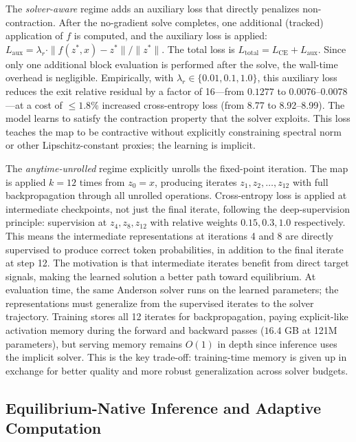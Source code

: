 The \emph{solver-aware} regime adds an auxiliary loss that directly penalizes non-contraction. After the no-gradient solve completes, one additional (tracked) application of $f$ is computed, and the auxiliary loss is applied: $L_\text{aux} = \lambda_r \cdot \|f(z^*, x) - z^*\| / \|z^*\|$. The total loss is $L_\text{total} = L_\mathrm{CE} + L_\text{aux}$. Since only one additional block evaluation is performed after the solve, the wall-time overhead is negligible. Empirically, with $\lambda_r \in \{0.01, 0.1, 1.0\}$, this auxiliary loss reduces the exit relative residual by a factor of 16---from $0.1277$ to $0.0076$--$0.0078$---at a cost of $\leq 1.8\%$ increased cross-entropy loss (from 8.77 to 8.92--8.99). The model learns to satisfy the contraction property that the solver exploits. This loss teaches the map to be contractive without explicitly constraining spectral norm or other Lipschitz-constant proxies; the learning is implicit.

The \emph{anytime-unrolled} regime explicitly unrolls the fixed-point iteration. The map is applied $k=12$ times from $z_0 = x$, producing iterates $z_1, z_2, \ldots, z_{12}$ with full backpropagation through all unrolled operations. Cross-entropy loss is applied at intermediate checkpoints, not just the final iterate, following the deep-supervision principle: supervision at $z_4, z_8, z_{12}$ with relative weights $0.15, 0.3, 1.0$ respectively. This means the intermediate representations at iterations 4 and 8 are directly supervised to produce correct token probabilities, in addition to the final iterate at step 12. The motivation is that intermediate iterates benefit from direct target signals, making the learned solution a better path toward equilibrium. At evaluation time, the same Anderson solver runs on the learned parameters; the representations must generalize from the supervised iterates to the solver trajectory. Training stores all 12 iterates for backpropagation, paying explicit-like activation memory during the forward and backward passes ($16.4$ GB at 121M parameters), but serving memory remains $O(1)$ in depth since inference uses the implicit solver. This is the key trade-off: training-time memory is given up in exchange for better quality and more robust generalization across solver budgets.

\subsection*{Equilibrium-Native Inference and Adaptive Computation}


